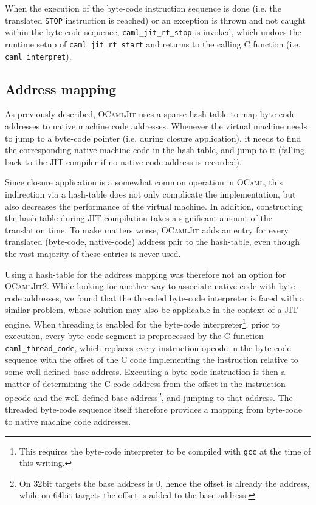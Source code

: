 \documentclass[10pt,a4paper,twocolumn]{article}
\begin{document}
When the execution of the byte-code instruction sequence is done (i.e. the translated \texttt{STOP}
instruction is reached) or an exception is thrown and not caught within the byte-code sequence,
\texttt{caml\_jit\_rt\_stop} is invoked, which undoes the runtime setup of \texttt{caml\_jit\_rt\_start}
and returns to the calling C function (i.e. \texttt{caml\_interpret}).

\subsection{Address mapping} \label{subsection:Address_mapping}

As previously described, \textsc{OCamlJit} uses a sparse hash-table to map byte-code addresses to
native machine code addresses.
Whenever the virtual machine needs to jump to a byte-code pointer (i.e. during closure application),
it needs to find the corresponding native machine code in the hash-table, and jump to it (falling back
to the JIT compiler if no native code address is recorded).

Since closure application is a somewhat common operation in \textsc{OCaml}, this indirection via a
hash-table does not only complicate the implementation, but also decreases the performance of the
virtual machine. In addition, constructing the hash-table during JIT compilation takes a significant
amount of the translation time. To make matters worse, \textsc{OCamlJit} adds an entry for every
translated (byte-code, native-code) address pair to the hash-table, even though the vast majority
of these entries is never used.

Using a hash-table for the address mapping was therefore not an option for \textsc{OCamlJit2}. While
looking for another way to associate native code with byte-code addresses, we found that the threaded
byte-code interpreter is faced with a similar problem, whose solution may also be applicable in the
context of a JIT engine. When threading is enabled for the byte-code interpreter\footnote{This requires
the byte-code interpreter to be compiled with \texttt{gcc} at the time of this writing.}, prior to
execution, every byte-code segment is preprocessed by the C function \texttt{caml\_thread\_code},
which replaces every instruction opcode in the byte-code sequence with the offset of the C code
implementing the instruction relative to some well-defined base address. Executing a byte-code
instruction is then a matter of determining the C code address from the offset in the instruction
opcode and the well-defined base address\footnote{On 32bit targets the base address is $0$, hence the
offset is already the address, while on 64bit targets the offset is added to the base address.},
and jumping to that address. The threaded byte-code sequence itself therefore provides a mapping
from byte-code to native machine code addresses.
\end{document}
